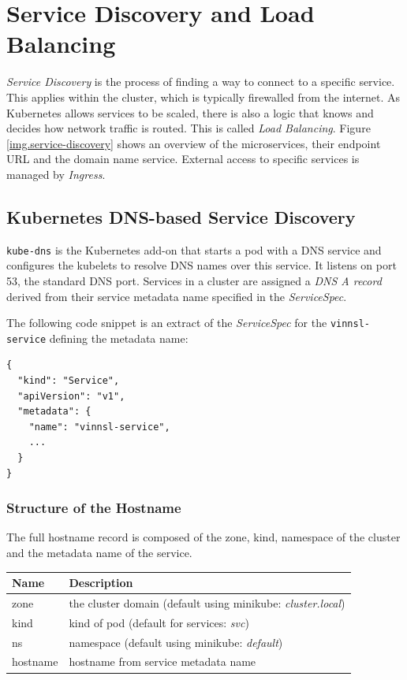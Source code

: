 \section{Service Discovery and Load
Balancing}\label{service-discovery-and-load-balancing}

\emph{Service Discovery} is the process of finding a way to connect to a
specific service. This applies within the cluster, which is typically
firewalled from the internet. As Kubernetes allows services to be
scaled, there is also a logic that knows and decides how network traffic
is routed. This is called \emph{Load Balancing}. Figure
\ref{img.service-discovery} shows an overview of the microservices,
their endpoint URL and the domain name service. External access to
specific services is managed by \emph{Ingress}.

\subsection{Kubernetes DNS-based Service
Discovery}\label{kubernetes-dns-based-service-discovery}

\texttt{kube-dns} is the Kubernetes add-on that starts a pod with a DNS
service and configures the kubelets to resolve DNS names over this
service. It listens on port 53, the standard DNS port. Services in a
cluster are assigned a \emph{DNS A record} derived from their service
metadata name specified in the \emph{ServiceSpec}. \cite{kub-dns-spec}

The following code snippet is an extract of the \emph{ServiceSpec} for
the \texttt{vinnsl-service} defining the metadata name:

\begin{verbatim}
{
  "kind": "Service",
  "apiVersion": "v1",
  "metadata": {
    "name": "vinnsl-service",
    ...
  }
}
\end{verbatim}

\subsubsection{Structure of the
Hostname}\label{structure-of-the-hostname}

The full hostname record is composed of the zone, kind, namespace of the
cluster and the metadata name of the service.

\begin{longtable}[]{@{}ll@{}}
\toprule
Name & Description\tabularnewline
\midrule
\endhead
zone & the cluster domain (default using minikube:
\emph{cluster.local})\tabularnewline
kind & kind of pod (default for services: \emph{svc})\tabularnewline
ns & namespace (default using minikube: \emph{default})\tabularnewline
hostname & hostname from service metadata name\tabularnewline
\bottomrule
\end{longtable}

